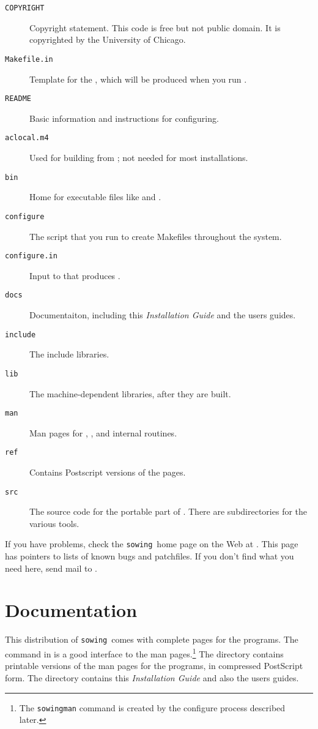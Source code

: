 \documentclass[11pt,twoside]{article}
\newcommand{\sowing}{{\tt sowing}}
\def\ttURL#1{{\tt\URL{#1}}}
\begin{document}
\begin{description}
\item[{\tt COPYRIGHT}] Copyright statement.  This code is free but not public
  domain.  It is copyrighted by the University of Chicago.
\item[{\tt Makefile.in}] Template for the , which will be
  produced when you   run .
\item[{\tt README}] Basic information and instructions for configuring.
\item[{\tt aclocal.m4}] Used for building  from ;
 not needed for most installations.
\item[{\tt bin}] Home for executable files like  and .
\item[{\tt configure}] The script that you run to create Makefiles throughout the
  system. 
\item[{\tt configure.in}] Input to  that produces .
\item[{\tt docs}] Documentaiton, including this {\em Installation Guide\/} and
  the users guides.
\item[{\tt include}] The include libraries.
\item[{\tt lib}] The machine-dependent libraries, after they are built.
\item[{\tt man}] Man pages for , , and internal routines.
\item[{\tt ref}] Contains Postscript versions of the  pages.
\item[{\tt src}] The source code for the portable part of .
  There are subdirectories for the various tools.
\end{description}

If you have problems, check the \sowing\ home page on the Web at
\gb\ttURL{http://www.mcs.anl.gov/\char`\~gropp/sowing} .  This page has
pointers 
to lists of known bugs and patchfiles.  If you don't find what you need here,
send mail to .

\section{Documentation}
\label{sec:documentation}

This distribution of \sowing\ comes with complete  pages for the
programs.  The command  in  is a good
interface to the man pages.\footnote{The {\tt sowingman} command is created by
  the configure process described later.}
The  directory contains printable versions
of the man pages for the programs, in compressed PostScript form.
The  directory contains this {\em Installation Guide\/} and
also the users guides.
\end{document}
